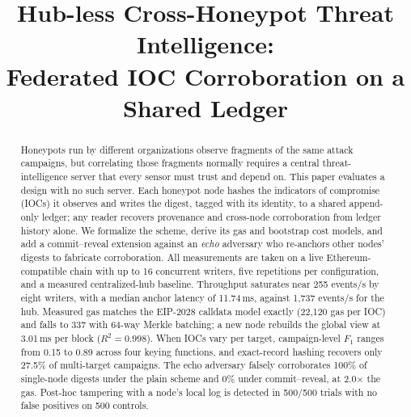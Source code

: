 \documentclass[conference]{IEEEtran}
\begin{document}
\title{Hub-less Cross-Honeypot Threat Intelligence:\\Federated IOC Corroboration on a Shared Ledger}

\author{
}

\maketitle

\begin{abstract}
Honeypots run by different organizations observe fragments of the same attack campaigns, but correlating those fragments normally requires a central threat-intelligence server that every sensor must trust and depend on. This paper evaluates a design with no such server. Each honeypot node hashes the indicators of compromise (IOCs) it observes and writes the digest, tagged with its identity, to a shared append-only ledger; any reader recovers provenance and cross-node corroboration from ledger history alone. We formalize the scheme, derive its gas and bootstrap cost models, and add a commit--reveal extension against an \emph{echo} adversary who re-anchors other nodes' digests to fabricate corroboration. All measurements are taken on a live Ethereum-compatible chain with up to 16 concurrent writers, five repetitions per configuration, and a measured centralized-hub baseline. Throughput saturates near 255 events/s by eight writers, with a median anchor latency of 11.74\,ms, against 1,737 events/s for the hub. Measured gas matches the EIP-2028 calldata model exactly (22,120 gas per IOC) and falls to 337 with 64-way Merkle batching; a new node rebuilds the global view at 3.01\,ms per block ($R^2=0.998$). When IOCs vary per target, campaign-level $F_1$ ranges from 0.15 to 0.89 across four keying functions, and exact-record hashing recovers only 27.5\% of multi-target campaigns. The echo adversary falsely corroborates 100\% of single-node digests under the plain scheme and 0\% under commit--reveal, at 2.0$\times$ the gas. Post-hoc tampering with a node's local log is detected in 500/500 trials with no false positives on 500 controls.
\end{abstract}
\end{document}
